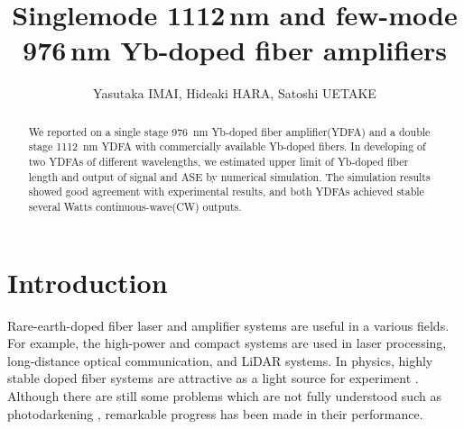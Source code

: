 \documentclass{osa-article}
\begin{document}
\title{Singlemode 1112\,nm and few-mode 976\,nm Yb-doped fiber amplifiers}

\author{Yasutaka IMAI, Hideaki HARA, Satoshi UETAKE}

\address{Reserch Institute for Interdisciplinary Science, Okayama University, Okayama, Japan}

\begin{abstract}
We reported on a single stage \SI{976}{nm} Yb-doped fiber amplifier(YDFA) and a double stage \SI{1112}{nm} YDFA with commercially available Yb-doped fibers.
In developing of two YDFAs of different wavelengths, we estimated upper limit of Yb-doped fiber length and output of signal and ASE by numerical simulation.
The simulation results showed good agreement with experimental results, and both YDFAs achieved stable several Watts continuous-wave(CW) outputs.
\end{abstract}

\listoftodos
\section{Introduction}
Rare-earth-doped fiber laser and amplifier systems are useful in a various fields.
For example, the high-power and compact systems are used in laser processing, long-distance optical communication, and LiDAR systems.
In physics, highly stable doped fiber systems are attractive as a light source for experiment \cite{burkley2017yb, coluccelli2016optical}.
Although there are still some problems which are not fully understood such as photodarkening \cite{paschotta1997lifetime}, remarkable progress has been made in their performance.
\end{document}
